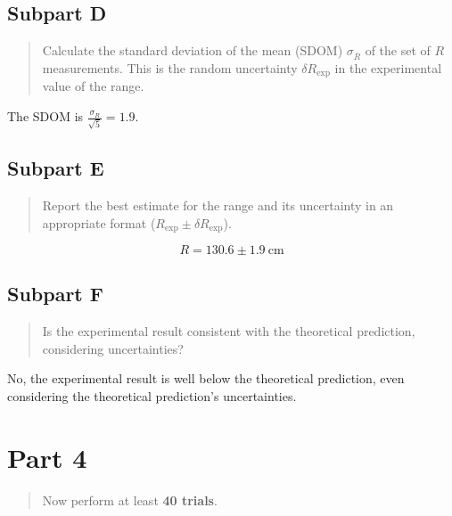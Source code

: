 \documentclass[8pt]{extarticle}
\newcommand{\plain}[1]{\textrm{#1}}
\begin{document}
{\subsection*{Subpart D}
\begin{quote}
	Calculate the standard deviation of the mean (SDOM) $ \sigma_{\overline{R}} $ of the set of $ R $ measurements.  This is the random uncertainty $ \delta R_{\plain{exp}} $ in the experimental value of the range. 
\end{quote}
The SDOM is $\frac{\sigma_{R}}{\sqrt{5}} = 1.9$.
\subsection*{Subpart E}
\begin{quote}
	Report the best estimate for the range and its uncertainty in an appropriate format ($ R_{\plain{exp}} \pm \delta R_{\plain{exp}} $).
\end{quote}
\[ R = 130.6\pm 1.9~\plain{cm} \]
\subsection*{Subpart F}
\begin{quote}
	Is the experimental result consistent with the theoretical prediction, considering uncertainties?
\end{quote}
No, the experimental result is well below the theoretical prediction, even considering the theoretical prediction's uncertainties.
\section*{Part 4}
\begin{quote}
	Now perform at least \textbf{40 trials}.
\end{quote}
}
\end{document}
